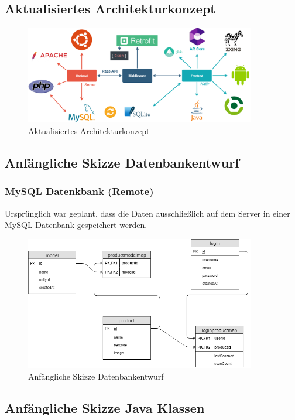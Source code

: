 \documentclass{scrartcl}
\begin{document}
\subsection{Aktualisiertes Architekturkonzept}

\begin{figure}[h]
\centering
\includegraphics[width=380px]{img/ArchitekturkonzeptNew.png}
\caption{Aktualisiertes Architekturkonzept}
\end{figure}

\newpage

\subsection{Anfängliche Skizze Datenbankentwurf}

\subsubsection{MySQL Datenkbank (Remote)}

Ursprünglich war geplant, dass die Daten ausschließlich auf dem Server in einer MySQL Datenbank gespeichert werden.

\begin{figure}[h]
\centering
\includegraphics[width=380px]{img/Skizze_Datenbank_1.png}
\caption{Anfängliche Skizze Datenbankentwurf}
\end{figure}

\newpage

\subsection{Anfängliche Skizze Java Klassen}
\end{document}
